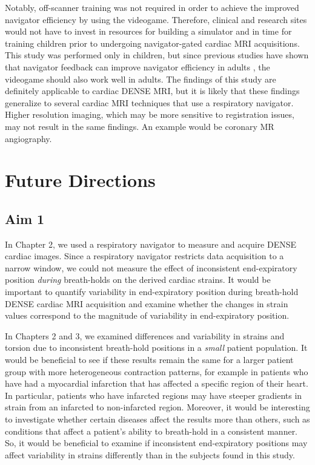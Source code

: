 	Notably, off-scanner training was not required in order to achieve the improved navigator efficiency by using the videogame. Therefore, clinical and research sites would not have to invest in resources for building a simulator and in time for training children prior to undergoing navigator-gated cardiac MRI acquisitions. This study was performed only in children, but since previous studies have shown that navigator feedback can improve navigator efficiency in adults \cite{Feuerlein2009,Liu1993}, the videogame should also work well in adults. The findings of this study are definitely applicable to cardiac DENSE MRI, but it is likely that these findings generalize to several cardiac MRI techniques that use a respiratory navigator. Higher resolution imaging, which may be more sensitive to registration issues, may not result in the same findings. An example would be coronary MR angiography.

\section{Future Directions}

\subsection{Aim 1}
	In Chapter 2, we used a respiratory navigator to measure and acquire DENSE cardiac images. Since a respiratory navigator restricts data acquisition to a narrow window, we could not measure the effect of inconsistent end-expiratory position \textit{during} breath-holds on the derived cardiac strains. It would be important to quantify variability in end-expiratory position during breath-hold DENSE cardiac MRI acquisition and examine whether the changes in strain values correspond to the magnitude of variability in end-expiratory position.
	
	In Chapters 2 and 3, we examined differences and variability in strains and torsion due to inconsistent breath-hold positions in a \textit{small} patient population. It would be beneficial to see if these results remain the same for a larger patient group with more heterogeneous contraction patterns, for example in patients who have had a myocardial infarction that has affected a specific region of their heart. In particular, patients who have infarcted regions may have steeper gradients in strain from an infarcted to non-infarcted region. Moreover, it would be interesting to investigate whether certain diseases affect the results more than others, such as conditions that affect a patient's ability to breath-hold in a consistent manner. So, it would be beneficial to examine if inconsistent end-expiratory positions may affect variability in strains differently than in the subjects found in this study.



